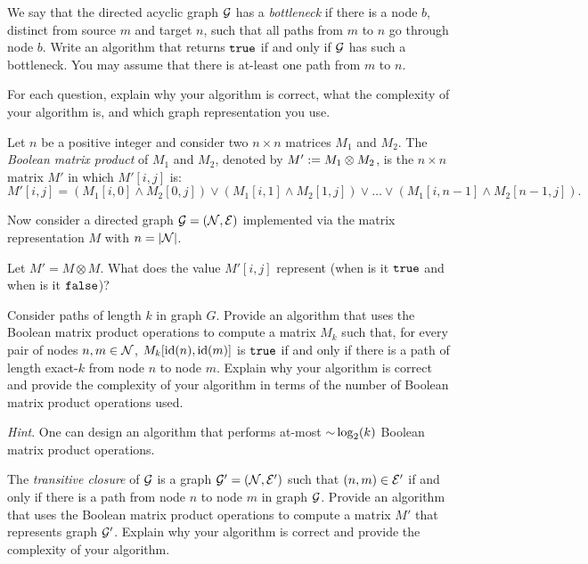 \begin{problem}
\begin{questions}
\item We say that the directed acyclic graph $\mathcal{G}$ has a \emph{bottleneck} if there is a node $b$, distinct from source $m$ and target $n$, such that all paths from $m$ to $n$ go through node $b$. Write an algorithm that returns $\texttt{true}$ if  and only if $\mathcal{G}$ has such a bottleneck. You may assume that there is at-least one path from $m$ to $n$.
\end{questions}
For each question, explain why your algorithm is correct, what the complexity of your algorithm is, and which graph representation you use.
\end{problem}

\begin{problem}
Let $n$ be a positive integer and consider two $n \times n$ matrices $M_1$ and $M_2$. The \emph{Boolean matrix product} of $M_1$ and $M_2$, denoted by $M' := M_1 \otimes M_2$, is the $n \times n$ matrix $M'$ in which $M'[i, j]$ is:
\[ M'[i, j] = (M_1[i, 0] \land M_2[0, j]) \lor (M_1[i, 1] \land M_2[1, j]) \lor \dots \lor (M_1[i, n-1] \land M_2[n-1,j]). \]

Now consider a directed graph $\mathcal{G} = (\mathcal{N}, \mathcal{E})$ implemented via the matrix representation $M$ with $n = \lvert \mathcal{N} \rvert$.
\begin{questions}
\item Let $M' = M \otimes M$. What does the value $M'[i,j]$ represent (when is it $\texttt{true}$ and when is it $\texttt{false}$)?
\item Consider paths of length $k$ in graph $G$. Provide an algorithm that uses the Boolean matrix product operations to compute a matrix $M_k$ such that, for every pair of nodes $n, m \in \mathcal{N}$, $M_k[\operatorname{id}(n), \operatorname{id}(m)]$ is $\texttt{true}$ if and only if there is a path of length exact-$k$ from node $n$ to node $m$. Explain why your algorithm is correct and provide the complexity of your algorithm in terms of the number of Boolean matrix product operations used.

\textit{Hint}. One can design an algorithm that performs at-most $\mathord{\sim}\log_2(k)$ Boolean matrix product operations.
\item The \emph{transitive closure} of $\mathcal{G}$ is a graph $\mathcal{G}' = (\mathcal{N}, \mathcal{E}')$ such that $(n, m) \in \mathcal{E}'$ if and only if there is a path from node $n$ to node $m$ in graph $\mathcal{G}$. Provide an algorithm that uses the Boolean matrix product operations to compute a matrix $M'$ that represents graph $\mathcal{G}'$. Explain why your algorithm is correct and provide the complexity of your algorithm.
\end{questions}
\end{problem}

